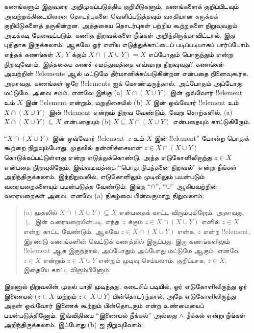 \documentclass[11pt,a4paper,openany]{memoir}
\begin{document}
\begin{explain}
கணங்களும் இதுவரை அறிமுகப்படுத்திய குறியீடுகளும்,
கணங்களைக் குறிப்பிடவும் அவற்றுக்கிடையிலான தொடர்புகளை
வெளிப்படுத்தவும் வசதியான சுருக்கக் குறியீடுகளைத் தருகின்றன.
அத்தகைய தொடர்புகள் பற்றிய கூற்றுகளை நிறுவுவதும் அடிக்கடி
தேவைப்படும். கணித நிறுவல்களை நீங்கள் அறிந்திருக்காவிட்டால்,
இது புதிதாக இருக்கலாம். ஆகவே ஓர் எளிய எடுத்துக்காட்டைப்
படிப்படியாகப் பார்ப்போம். எந்தக் கணங்கள் $X$, $Y$ க்கும்
$X \cap (X \cup Y) = X$ எப்போதும் பொருந்தும் என்று
நிறுவுவோம். இத்தகைய கணச் சமத்துவத்தை எவ்வாறு நிறுவுவது?
கணங்கள் அவற்றின் !!{element}s ஆல் மட்டுமே தீர்மானிக்கப்படுகின்றன
என்பதை நினைவுகூர்க. அதாவது, கணங்கள் ஒரே !!{element}s ஐக்
கொண்டிருந்தால், அப்போதும் அப்போது மட்டுமே, அவை சமம்.
எனவே இங்கு (a) $X \cap (X \cup Y)$ இன் ஒவ்வோர் !!{element}
உம் $X$ இன் !!{element} என்றும், மறுதிசையில்
(b) $X$ இன் ஒவ்வோர் !!{element} உம் $X \cap (X \cup Y)$ இன்
!!{element} என்றும் நிறுவ வேண்டும். வேறு சொற்களில்,
(a) $X \cap (X \cup Y) \subseteq X$ என்பதையும்
(b) $X \subseteq X \cap (X \cup Y)$ என்பதையும் காட்டுகிறோம்.

``$X \cap (X \cup Y)$ இன் ஒவ்வோர் !!{element}~$z$ உம்
$X$ இன் !!{element}'' போன்ற பொதுக் கூற்றை நிறுவும்போது,
முதலில் தன்னிச்சையான $z \in X \cap (X \cup Y)$ கொடுக்கப்பட்டுள்ளது
என்று எடுத்துக்கொண்டு, அந்த எடுகோளிலிருந்து $z \in X$ என்பதை
நிறுவுகிறோம். இவ்வடிவத்தை ``பொது நிபந்தனை நிறுவல்'' என்று
நீங்கள் அறிந்திருக்கலாம். இந்நிறுவலில், எடுகோளிலும் முடிவிலும்
பயன்படும் வரையறைகளையும் பயன்படுத்த வேண்டும்; இங்கு
``$\cap$'', ``$\cup$'' ஆகியவற்றின் வரையறைகள் அவை.
எனவே (a) நிகழ்வை பின்வருமாறு நிறுவலாம்:

\begin{quote}
(a) முதலில் $X \cap (X \cup Y) \subseteq X$ என்பதைக்
காட்ட விரும்புகிறோம். அதாவது, $\subseteq$ இன் வரையறையின்படி,
எந்த~$z$ க்கும் $z \in X \cap (X \cup Y)$ எனில்
$z \in X$ என்று காட்ட வேண்டும். ஆகவே
$z \in X \cap (X \cup Y)$ என்க. $z$ என்ற !!{element},
இரண்டு கணங்களின் வெட்டுக் கணத்தில் இருப்பது, இரு கணங்களிலும்
!!{element} ஆக இருந்தால், அப்போதும் அப்போது மட்டுமே ஆகும்.
எனவே $z \in X$ என்றும் $z \in X \cup Y$ என்றும் முடிவு
செய்யலாம். குறிப்பாக, $z \in X$; இதையே காட்ட விரும்பினோம்.
\end{quote}

இதனால் நிறுவலின் முதல் பாதி முடிந்தது. கடைசிப் படியில்,
ஓர் எடுகோளிலிருந்து ஓர் இணையல் ($z \in X$ மற்றும்
$z \in X \cup Y$) பின்தொடர்ந்தால், அதே எடுகோளிலிருந்து
அதன் ஒவ்வோர் இணைக் கூற்றும் பின்தொடரும் என்ற உண்மையைப்
பயன்படுத்தினோம். இவ்விதியை ``இணையல் நீக்கல்'' அல்லது
$\land$ நீக்கல் என்று நீங்கள் அறிந்திருக்கலாம்.
இப்போது (b) ஐ நிறுவுவோம்:


\end{explain}
\end{document}
